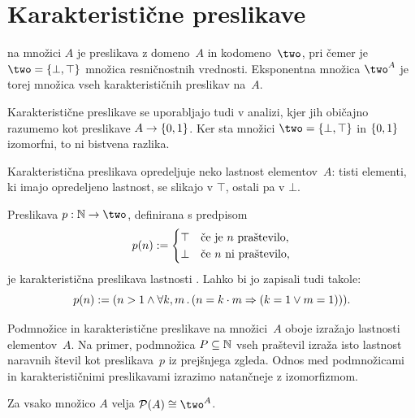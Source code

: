 \section{Karakteristične preslikave}
\label{sec:karakteristicne-preslikave}


 na množici $A$ je preslikava z domeno~$A$ in kodomeno~$\two$, pri čemer je $\two = \set{\bot, \top}$ množica resničnostnih vrednosti.
%
Eksponentna množica $\two^A$ je torej množica vseh karakterističnih preslikav na~$A$.

\begin{opomba}
  Karakteristične preslikave se uporabljajo tudi v analizi, kjer jih
  običajno razumemo kot preslikave $A \to \left\{0,1\right\}$. Ker sta množici $\two = \set{\bot,\top}$ in $\left\{0,1\right\}$ izomorfni, to ni bistvena razlika.
\end{opomba}

Karakteristična preslikava opredeljuje neko lastnost elementov~$A$: tisti elementi, ki imajo opredeljeno lastnost, se
slikajo v $\top$, ostali pa v $\bot$.

\begin{zgled}
  Preslikava $p : \NN \to \two$, definirana s predpisom
  \begin{equation*}
    p(n) \mathrel{{:}{=}}
    \begin{cases}
      \top & \text{če je $n$ praštevilo}, \\
      \bot & \text{če $n$ ni praštevilo},
    \end{cases}
  \end{equation*}
  je karakteristična preslikava lastnosti . Lahko bi jo zapisali tudi takole:
  \begin{equation*}
    p(n) \mathrel{{:}{=}} (n > 1 \land \forall k, m \,.\, (n = k \cdot m \Rightarrow (k = 1 \lor m = 1))).
  \end{equation*}
\end{zgled}

Podmnožice in karakteristične preslikave na množici~$A$ oboje izražajo lastnosti elementov~$A$.
%
Na primer, podmnožica $P \subseteq \mathbb{N}$ vseh praštevil izraža isto lastnost naravnih števil kot preslikava~$p$ iz prejšnjega zgleda.
%
Odnos med podmnožicami in karakterističnimi preslikavami izrazimo natančneje z izomorfizmom.


\begin{izrek}
  \label{izrek:potencna-karakteristicne}
  Za vsako množico $A$ velja $\pow{A} \cong \two^A$.
\end{izrek}


